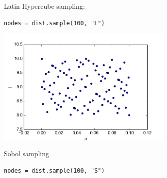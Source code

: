 \documentclass[handout]{beamer}
\newcommand{\E}[1]{\mbox{E}\!\left(#1\right)}
\newcommand{\Var}[1]{\mbox{Var}\!\left(#1\right)}
\begin{document}
\begin{frame}[fragile]
\begin{columns}
\begin{center}
                Latin Hypercube sampling:

                \scriptsize
                \verb;nodes = dist.sample(100, "L");
                \normalsize



                \includegraphics[width=0.65\textwidth]{samples_S.png}

                Sobol sampling

                \scriptsize
                \verb;nodes = dist.sample(100, "S");
                \normalsize
     \end{center}
 \end{columns}
\end{frame}



\end{document}
